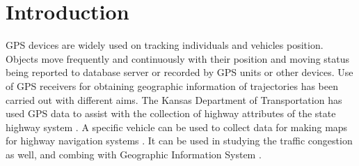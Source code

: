 %
%
%
%
%
%
%



\section{Introduction}

GPS devices are widely used on tracking individuals and vehicles position. Objects move frequently and continuously with their position and moving status being reported to database server or recorded by GPS units or other devices. Use of GPS receivers for obtaining geographic information of trajectories has been carried out with different aims. The Kansas Department of Transportation has used GPS data to assist with the collection of highway attributes of the state highway system \cite{ben2004geometric}.  A specific vehicle can be used to collect data for making maps for highway navigation systems \cite{Atkinson2004}. It can be used in studying the traffic congestion as well, and combing with Geographic Information System \cite{taylor2000integration}. 


